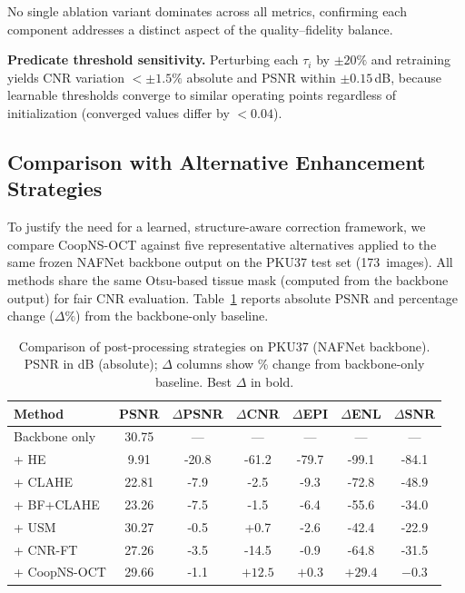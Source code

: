 \documentclass[journal,twoside,web]{ieeecolor}
\begin{document}
No single ablation variant dominates across all metrics, confirming each component addresses a distinct aspect of the quality--fidelity balance.

\textbf{Predicate threshold sensitivity.} Perturbing each $\tau_i$ by $\pm 20\%$ and retraining yields CNR variation $< \pm 1.5\%$ absolute and PSNR within $\pm 0.15$\,dB, because learnable thresholds converge to similar operating points regardless of initialization (converged values differ by $< 0.04$).

\subsection{Comparison with Alternative Enhancement Strategies}
\label{sec:comparison}

To justify the need for a learned, structure-aware correction framework, we compare CoopNS-OCT against five representative alternatives applied to the same frozen NAFNet backbone output on the PKU37 test set (173~images). All methods share the same Otsu-based tissue mask (computed from the backbone output) for fair CNR evaluation. Table~\ref{tab:comparison} reports absolute PSNR and percentage change ($\Delta\%$) from the backbone-only baseline.

\begin{table}[t]
\centering
\caption{Comparison of post-processing strategies on PKU37 (NAFNet backbone). PSNR in dB (absolute); $\Delta$ columns show \% change from backbone-only baseline. Best $\Delta$ in bold.}
\label{tab:comparison}
\setlength{\tabcolsep}{2pt}
\footnotesize
\begin{tabular}{lcccccc}
\toprule
Method & PSNR & $\Delta$PSNR & $\Delta$CNR & $\Delta$EPI & $\Delta$ENL & $\Delta$SNR \\
\midrule
Backbone only & 30.75 & --- & --- & --- & --- & --- \\
+ HE~\cite{gonzalez2018digital} & 9.91 & -20.8 & -61.2 & -79.7 & -99.1 & -84.1 \\
+ CLAHE~\cite{zuiderveld1994clahe} & 22.81 & -7.9 & -2.5 & -9.3 & -72.8 & -48.9 \\
+ BF+CLAHE~\cite{tomasi1998bilateral} & 23.26 & -7.5 & -1.5 & -6.4 & -55.6 & -34.0 \\
+ USM~\cite{polesel2000image} & 30.27 & -0.5 & +0.7 & -2.6 & -42.4 & -22.9 \\
+ CNR-FT & 27.26 & -3.5 & -14.5 & -0.9 & -64.8 & -31.5 \\
+ CoopNS-OCT & 29.66 & -1.1 & $\mathbf{+12.5}$ & $\mathbf{+0.3}$ & $\mathbf{+29.4}$ & $\mathbf{-0.3}$ \\
\bottomrule
\end{tabular}
\end{table}
\end{document}
